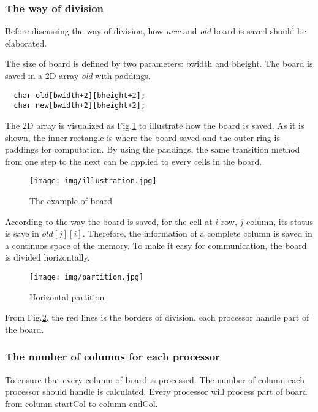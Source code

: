 \documentclass[sigchi]{acmart}
\begin{document}
\subsubsection{The way of division}
Before discussing the way of division, how \textit{new} and \textit{old} board is saved should be elaborated. 

The size of board is defined by two parameters: bwidth and bheight. The board is saved in a 2D array \textit{old} with paddings.
\begin{lstlisting}
  char old[bwidth+2][bheight+2];
  char new[bwidth+2][bheight+2];
\end{lstlisting} 

The 2D array is visualized as Fig.\ref{fig:illustration} to illustrate how the board is saved. As it is shown, the inner rectangle is where the board saved and the outer ring is paddings for computation.
By using the paddings, the same transition method from one step to the next can be applied to every cells in the board.


\begin{figure}[h]

  \texttt{[image: img/illustration.jpg]}
  \centering
  \caption{The example of board}
  \label{fig:illustration}
\end{figure}

According to the way the board is saved, for the cell at $i$ row, $j$ column, its status is save in $old[j][i]$.
Therefore, the information of a complete column is saved in a continuos space of the memory.
To make it easy for communication, the board is divided horizontally. 


\begin{figure}[h]

  \texttt{[image: img/partition.jpg]}
  \centering
  \caption{Horizontal partition}
  \label{fig:partition}
\end{figure}

From Fig.\ref{fig:partition}, the red lines is the borders of division. each processor handle part of the board.

\subsubsection{The number of columns for each processor}

To ensure that every column of board is processed. The number of column each processor should handle is calculated.
Every processor will process part of board from column startCol to column endCol.
\end{document}
